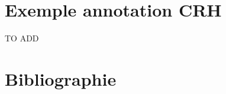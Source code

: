 
\section{Exemple annotation CRH}
\label{sec:exemple_annotation_crh}

TO ADD

\section{Bibliographie}

